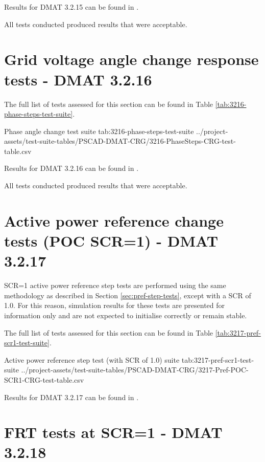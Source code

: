 \documentclass{../grid-link-report}
\newcommand{\projectassetsdir}{../project-assets}
\begin{document}
	Results for DMAT 3.2.15 can be found in .
	
	All tests conducted produced results that were acceptable.
	
	\section{Grid voltage angle change response tests - DMAT 3.2.16}		
	
	
	
	The full list of tests assessed for this section can be found in Table \ref{tab:3216-phase-steps-test-suite}.
	
	{
		\fontsize{7}{9}\selectfont
		\autoscaledlongtable
		{Phase angle change test suite}
		{tab:3216-phase-steps-test-suite}
		{\projectassetsdir/test-suite-tables/PSCAD-DMAT-CRG/3216-PhaseSteps-CRG-test-table.csv}
	}
	
	Results for DMAT 3.2.16 can be found in .
	
	All tests conducted produced results that were acceptable.
	
	
	\section{Active power reference change tests (POC SCR=1) - DMAT 3.2.17}		
	
	SCR=1 active power reference step tests are performed using the same methodology as described in Section \ref{sec:pref-step-tests}, except with a \ac{SCR} of 1.0. For this reason, simulation results for these tests are presented for information only and are not expected to initialise correctly or remain stable.
	
	The full list of tests assessed for this section can be found in Table \ref{tab:3217-pref-scr1-test-suite}.
	
	{
		\fontsize{7}{9}\selectfont
		\autoscaledlongtable
		{Active power reference step test (with SCR of 1.0) suite}
		{tab:3217-pref-scr1-test-suite}
		{\projectassetsdir/test-suite-tables/PSCAD-DMAT-CRG/3217-Pref-POC-SCR1-CRG-test-table.csv}
	}
	
	Results for DMAT 3.2.17 can be found in .
	
	
	\section{FRT tests at SCR=1 - DMAT 3.2.18}		
	
\end{document}
